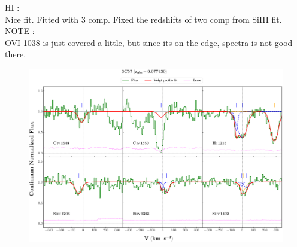 \documentclass[12pt,draft]{report}
\begin{document}
HI :  \\  \hspace*{1.5cm}
        Nice fit. Fitted with 3 comp. Fixed the redshifts of two comp from SiIII fit.  \\

NOTE  :  \\  \hspace*{1.5cm} OVI 1038 is just covered a little, but since its on the edge, spectra is not good there.  \\




\newpage

\begin{landscape}

\begin{figure}
    \centering
    \vspace{-20mm}
    \hspace*{-35mm}
    \includegraphics[width=1.25\linewidth]{System-Plots/3C57_z=0.077430_sys_plot.png}
\end{figure}

\end{landscape}
\end{document}
